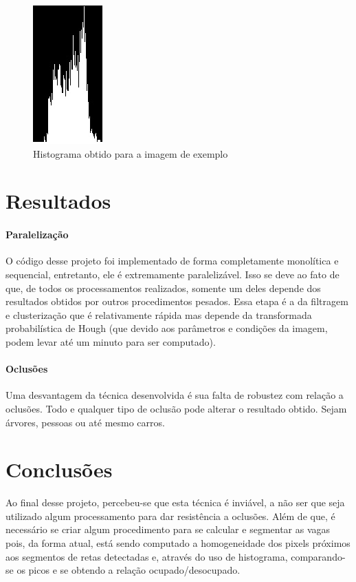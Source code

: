 \documentclass[10pt,twocolumn,letterpaper]{article}
\begin{document}
\begin{figure}[!htp]
\centering
\includegraphics[width=0.33\columnwidth]{hist-ocupacao.jpg}
 \caption{Histograma obtido para a imagem de exemplo}
\label{fig:hist}
\end{figure}

\section{Resultados}

\paragraph{Paralelização}
	O código desse projeto foi implementado de forma completamente monolítica e sequencial,
entretanto, ele é extremamente paralelizável. Isso se deve ao fato de que, de todos os processamentos
realizados, somente um deles depende dos resultados obtidos por outros procedimentos pesados.
Essa etapa é a da filtragem e clusterização que é relativamente rápida mas depende da transformada
probabilística de Hough (que devido aos parâmetros e condições da imagem, podem levar até um minuto
para ser computado).

\paragraph{Oclusões}
	Uma desvantagem da técnica desenvolvida é sua falta de robustez com relação a oclusões.
Todo e qualquer tipo de oclusão pode alterar o resultado obtido. Sejam árvores, pessoas ou até
mesmo carros.


\section{Conclusões}
	Ao final desse projeto, percebeu-se que esta técnica é inviável, a não ser que seja utilizado
algum processamento para dar resistência a oclusões. Além de que, é necessário se criar algum
procedimento para se calcular e segmentar as vagas pois, da forma atual, está sendo computado
a homogeneidade dos pixels próximos aos segmentos de retas detectadas e, através do uso de
histograma, comparando-se os picos e se obtendo a relação ocupado/desocupado.



{\small


}
\end{document}
